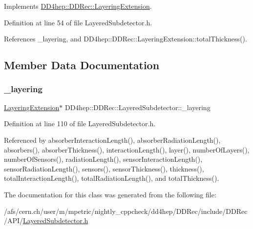 Implements \hyperlink{class_d_d4hep_1_1_d_d_rec_1_1_layering_extension_a287dd58b108f5d121bc55c91009454ed}{D\+D4hep\+::\+D\+D\+Rec\+::\+Layering\+Extension}.



Definition at line 54 of file Layered\+Subdetector.\+h.



References \+\_\+layering, and D\+D4hep\+::\+D\+D\+Rec\+::\+Layering\+Extension\+::total\+Thickness().



\subsection{Member Data Documentation}
\hypertarget{class_d_d4hep_1_1_d_d_rec_1_1_layered_subdetector_a01f66cc99e59bf522dff6c7295235692}{}\label{class_d_d4hep_1_1_d_d_rec_1_1_layered_subdetector_a01f66cc99e59bf522dff6c7295235692} 
\subsubsection{\texorpdfstring{\+\_\+layering}{\_layering}}
{\footnotesize\ttfamily \hyperlink{class_d_d4hep_1_1_d_d_rec_1_1_layering_extension}{Layering\+Extension}$\ast$ D\+D4hep\+::\+D\+D\+Rec\+::\+Layered\+Subdetector\+::\+\_\+layering\hspace{0.3cm}{\ttfamily [protected]}}



Definition at line 110 of file Layered\+Subdetector.\+h.



Referenced by absorber\+Interaction\+Length(), absorber\+Radiation\+Length(), absorbers(), absorber\+Thickness(), interaction\+Length(), layer(), number\+Of\+Layers(), number\+Of\+Sensors(), radiation\+Length(), sensor\+Interaction\+Length(), sensor\+Radiation\+Length(), sensors(), sensor\+Thickness(), thickness(), total\+Interaction\+Length(), total\+Radiation\+Length(), and total\+Thickness().



The documentation for this class was generated from the following file\+:\begin{DoxyCompactItemize}
\item 
/afs/cern.\+ch/user/m/mpetric/nightly\+\_\+cppcheck/dd4hep/\+D\+D\+Rec/include/\+D\+D\+Rec/\+A\+P\+I/\hyperlink{_layered_subdetector_8h}{Layered\+Subdetector.\+h}\end{DoxyCompactItemize}
